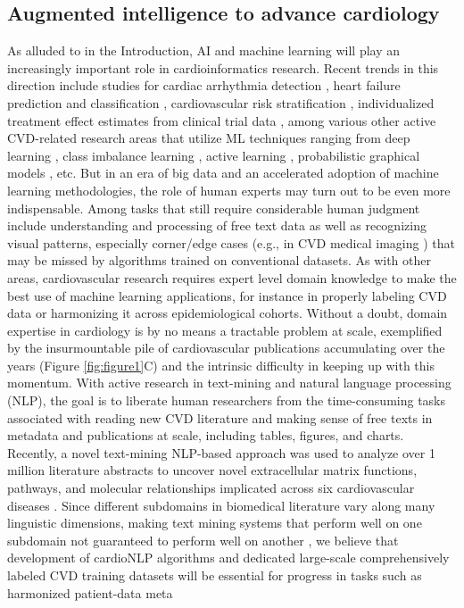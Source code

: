 \documentclass[letter]{bib}
\begin{document}
	\subsection*{Augmented intelligence to advance cardiology}
	As alluded to in the Introduction, AI and machine learning will play an increasingly important role in cardioinformatics research.  Recent trends in this direction include studies for cardiac arrhythmia detection \citep{Hannun:2019:Cardiologist}, heart failure prediction and classification \citep{Awan:2018:Machine,Choi:2017:Using,Shah:2015:phenomapping}, cardiovascular risk stratification \citep{Singh:2011:Acomparison}, individualized treatment effect estimates from clinical trial data \citep{Duan:2019:Clinical}, among various other active CVD-related research areas \citep{Johnson:2018:Artificial,Alaref:2018:Clinical,Krittanawong:2017:Artificial,Zeevi:2015:Personalized} that utilize ML techniques ranging from deep learning \citep{Hannun:2019:Cardiologist,Bizopoulos:2018:Deep,Madani:2018:Deep,Lee:2018:Deep,Kwon:2018:Algorithm,Choi:2017:Using}, class imbalance learning \citep{Liu:2014:Risk,Rahman2013AddressingTC}, active learning \citep{NIPS2010_4091}, probabilistic graphical models \citep{Orphanou:2016:DBN,Gong:2015:Inferring}, etc.  But in an era of big data and an accelerated adoption of machine learning methodologies, the role of human experts may turn out to be even more indispensable. Among tasks that still require considerable human judgment include understanding and processing of free text data as well as recognizing visual patterns, especially corner/edge cases (e.g., in CVD medical imaging \citep{Slomka:2017:Cardiac,Fonseca:2011:Cardiac}) that may be missed by algorithms trained on conventional datasets.  As with other areas, cardiovascular research requires expert level domain knowledge to make the best use of machine learning applications, for instance in properly labeling CVD data or harmonizing it across epidemiological cohorts.  Without a doubt, domain expertise in cardiology is by no means a tractable problem at scale, exemplified by the insurmountable pile of cardiovascular publications accumulating over the years (Figure \ref{fig:figure1}C) and the intrinsic difficulty in keeping up with this momentum.  With active research in text-mining and natural language processing (NLP), the goal is to liberate human researchers from the time-consuming tasks associated with reading new CVD literature and making sense of free texts in metadata and publications at scale, including tables, figures, and charts.  Recently, a novel text-mining NLP-based approach was used to analyze over 1 million literature abstracts to uncover novel extracellular matrix functions, pathways, and molecular relationships implicated across six cardiovascular diseases \citep{Liem:2018:phrase}.  Since different subdomains in biomedical literature vary along many linguistic dimensions, making text mining systems that perform well on one subdomain not guaranteed to perform well on another \citep{Lippincott:2011:Exploring, Kilicoglu:2018:Biomedical, Khomtchouk:2018:Biochat}, we believe that development of cardioNLP algorithms and dedicated large-scale comprehensively labeled CVD training datasets will be essential for progress in tasks such as harmonized patient-data meta 
\end{document}
